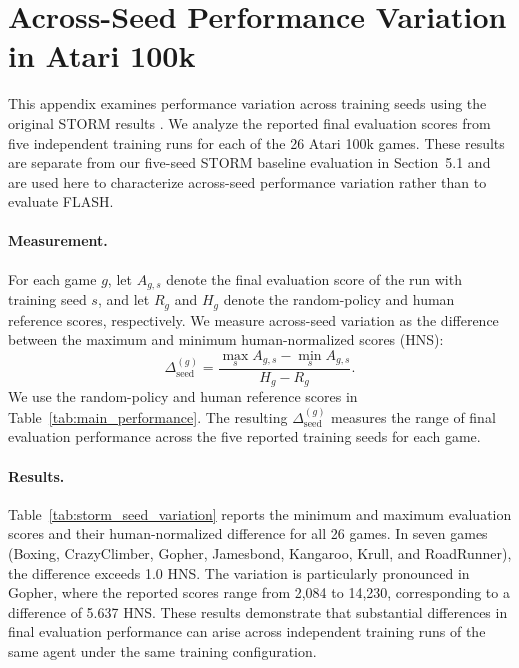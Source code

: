 \documentclass{article} %
\begin{document}
\onecolumn

\section{Across-Seed Performance Variation in Atari 100k}
\label{sec:appendix_ac_bottleneck}

This appendix examines performance variation across training seeds using the original STORM results \citep{zhang2023storm}. We analyze the reported final evaluation scores from five independent training runs for each of the 26 Atari 100k games. These results are separate from our five-seed STORM baseline evaluation in Section~5.1 and are used here to characterize across-seed performance variation rather than to evaluate FLASH.

\paragraph{Measurement.}
For each game $g$, let $A_{g,s}$ denote the final evaluation score of the run with training seed $s$, and let $R_g$ and $H_g$ denote the random-policy and human reference scores, respectively. We measure across-seed variation as the difference between the maximum and minimum human-normalized scores (HNS):
\begin{equation}
\Delta_{\mathrm{seed}}^{(g)} = \frac{\max_s A_{g,s} - \min_s A_{g,s}}{H_g - R_g}.
\end{equation}
We use the random-policy and human reference scores in Table~\ref{tab:main_performance}. The resulting $\Delta_{\mathrm{seed}}^{(g)}$ measures the range of final evaluation performance across the five reported training seeds for each game.

\paragraph{Results.}
Table~\ref{tab:storm_seed_variation} reports the minimum and maximum evaluation scores and their human-normalized difference for all 26 games. In seven games (Boxing, CrazyClimber, Gopher, Jamesbond, Kangaroo, Krull, and RoadRunner), the difference exceeds 1.0 HNS. The variation is particularly pronounced in Gopher, where the reported scores range from 2,084 to 14,230, corresponding to a difference of 5.637 HNS. These results demonstrate that substantial differences in final evaluation performance can arise across independent training runs of the same agent under the same training configuration.
\end{document}
